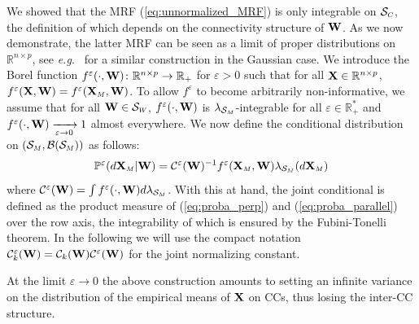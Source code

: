 We showed that the MRF (\ref{eq:unnormalized_MRF}) is only integrable on $\mathcal{S}_{\scaleto{C}{4pt}}$, the definition of which depends on the connectivity structure of $\mathbf{W}$. As we now demonstrate, the latter MRF can be seen as a limit of proper distributions on $\mathbb{R}^{n \times p}$, see \textit{e.g.}\ \cite{rue2005gaussian} for a similar construction in the Gaussian case. 
We introduce the Borel function $f^{\varepsilon}(\cdot, \mathbf{W}) \colon \mathbb{R}^{n \times p} \to \mathbb{R}_+$ for $\varepsilon > 0$ such that for all $\mathbf{X} \in \mathbb{R}^{n \times p}$, $f^{\varepsilon}(\Xb, \Wb) = f^{\varepsilon}(\Xb_{\scaleto{M}{4pt}}, \Wb)$. To allow $f^{\varepsilon}$ to become arbitrarily non-informative, we assume that for all $\Wb \in \mathcal{S}_{\scaleto{W}{4pt}}$, $f^\varepsilon(\cdot, \mathbf{W})$ is $\lambda_{\scaleto{\mathcal{S}_{\scaleto{M}{3pt}}}{6pt}}$-integrable for all $\varepsilon \in \mathbb{R}^*_+$ and $f^{\varepsilon}(\cdot, \mathbf{W}) \xrightarrow[\varepsilon \to 0]{} 1$ almost everywhere.
We now define the conditional distribution on $(\mathcal{S}_{\scaleto{M}{4pt}}, \mathcal{B}(\mathcal{S}_{\scaleto{M}{4pt}}))$ as follows:
\begin{align}\label{eq:proba_parallel}
     \mathbb{P}^{\varepsilon}(d\Xb_{\scaleto{M}{4pt}}| \Wb) = \mathcal{C}^{\varepsilon}(\Wb)^{-1} f^{\varepsilon}(\Xb_{\scaleto{M}{4pt}}, \Wb) \lambda_{\mathcal{S}_{\scaleto{M}{3pt}}}(d\Xb_{\scaleto{M}{4pt}})
\end{align}
where $\mathcal{C}^{\varepsilon}(\Wb) = \int f^{\varepsilon}(\cdot, \Wb) d\lambda_{\mathcal{S}_{\scaleto{M}{3pt}}}$.
With this at hand, the joint conditional is defined as the product measure of (\ref{eq:proba_perp}) and (\ref{eq:proba_parallel}) over the row axis, the integrability of which is ensured by the Fubini-Tonelli theorem. In the following we will use the compact notation $\mathcal{C}^{\varepsilon}_k(\mathbf{W}) = \mathcal{C}_k(\mathbf{W})\mathcal{C}^{\varepsilon}(\mathbf{W})$ for the joint normalizing constant.

\begin{remark}
At the limit $\varepsilon \to 0$ the above construction amounts to setting an infinite variance on the distribution of the empirical means of $\mathbf{X}$ on CCs, thus losing the inter-CC structure. 
\end{remark}

